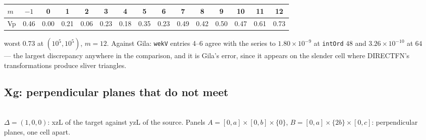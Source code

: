 \documentclass[11pt]{article}
\theoremstyle{remark}
\newcommand{\code}[1]{\texttt{#1}}
\newcommand{\geofig}[2]{\begin{center}#1\\[2pt]{\footnotesize #2}\end{center}}
\begin{document}
\begin{center}\small
\begin{tabular}{@{}lcccccccccccccc@{}}
\toprule
$m$ & $-1$ & 0 & 1 & 2 & 3 & 4 & 5 & 6 & 7 & 8 & 9 & 10 & 11 & 12\\
\midrule
Vp & 0.46 & 0.00 & 0.21 & 0.06 & 0.23 & 0.18 & 0.35 & 0.23 & 0.49 & 0.42 & 0.50 & 0.47 & 0.61 & 0.73\\
\bottomrule
\end{tabular}
\end{center}
\noindent
worst $0.73$ at $(10^{5}, 10^{5})$, $m = 12$. Against Gila: \code{wekV} entries 4--6 agree
with the series to $1.80\times10^{-9}$ at \code{intOrd} $48$ and $3.26\times10^{-10}$ at
$64$ --- the largest discrepancy anywhere in the comparison, and it is Gila's error, since
it appears on the slender cell where DIRECTFN's transformations produce sliver triangles.

\subsection{Xg: perpendicular planes that do not meet}
\label{sec:Xg}

\geofig{\figXg}{$\Delta = (1,0,0)$: xzL of the target against yzL of the source. Panels
$A = [0,a]\times[0,b]\times\{0\}$, $B = [0,a]\times\{2b\}\times[0,c]$: perpendicular
planes, one cell apart.}
\end{document}

